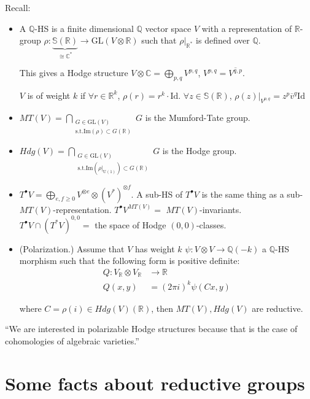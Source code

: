 \noindent
Recall:
\begin{itemize}
\item A $\mathbb{Q}$-HS is a finite
dimensional $\mathbb{Q}$
vector space $V$ with a representation of
$\mathbb{R}$-group
$\rho:\underbrace{\mathbb{S}(\mathbb{R})}
_{\cong\mathbb{C}^*}
\to \text{GL}(V \otimes \mathbb{R})$
such that $\rho|_{\mathbb{R}^*}$ is defined
over $\mathbb{Q}$.

This gives a Hodge structure
$V\otimes \mathbb{C}=\bigoplus_{p,q}V^{p,q}$,
$V^{p,q}=\overline{V^{q,p}}$.

$V$ is of weight $k$ if
$\forall  r \in \mathbb{R}^k$,
$\rho(r)=r^k\cdot \text{Id}$.
$\forall z \in \mathbb{S}(\mathbb{R})$,
$\rho(z)|_{V^{p,q}}=z^p\overline{v}
^q\text{Id}$

\item $MT(V)=\bigcap_{\substack{G \in
\text{GL}(V) \\
\text{s.t.}\text{Im}(\rho) \subset
G(\mathbb{R})}}G$
is the Mumford-Tate group.

\item $Hdg(V)=\bigcap_{\substack{
G \in \text{GL}(V)\\
\text{s.t.}\text{Im}(\rho|_{\text{U}(1)})
\subset
G(\mathbb{R})}}G$
is the Hodge group.

\item $T^\bullet V=\bigoplus_{e,f \geq 0}
V^{\otimes e}\otimes(V^* )^{\otimes f}$.
A sub-HS of $T^\bullet V$ is the same thing
as a
sub-$MT(V)$-representation.
$T^\bullet V^{MT(V)}=$ $MT(V)$-invariants.
$T^\bullet V \cap(T^*V)^{0,0}=$ the space of
Hodge $(0,0)$-classes.

\item (Polarization.)
Assume that $V$ has weight $k$
$\psi:V \otimes V \to \mathbb{Q}(-k)$ a
$\mathbb{Q}$-HS morphism
such that the following form is positive
definite:
$$
\begin{aligned}
Q: V_{\mathbb{R}}\otimes V_{\mathbb{R}}
&\longrightarrow \mathbb{R} \\
Q(x,y) &=(2\pi i)^k \psi(Cx,y)
\end{aligned}
$$

\noindent
where $C=\rho(i) \in Hdg(V)(\mathbb{R})$,
then $MT(V),Hdg(V)$ are reductive.

\end{itemize}

\noindent
``We are interested in polarizable Hodge
structures
because that is the case of cohomologies of
algebraic varieties.''

\section{Some facts about reductive groups}
\label{section-reductive-groups}

